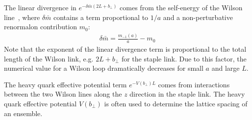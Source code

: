 \documentclass[prd,aps,twocolumn,preprintnumbers, showpacs, nofootinbib,superscriptaddress,notitlepage]{revtex4-1}
\newcommand\bl{\color{blue}}
\begin{document}
The linear divergence {\bl in} $e^{-\delta \bar{m}(2L+b_{\perp})}$ comes from the self-energy of  {\bl the}  Wilson line~\cite{Ji:2017oey,Ishikawa:2017faj,Green:2017xeu, Ji:2020brr}, where $\delta\bar m$ {\bl contains a term  proportional to} $1/a$  and {\bl a  non-perturbative renormalon contribution} $m_{0}$:
\begin{align}
\delta\bar m = \frac{m_{-1}(a)}{a} - m_0
\end{align}
{\bl Note} that the exponent {\bl of the linear divergence term} is proportional to the total length of {\bl the} Wilson link, e.g. $2L+b_{\perp}$ for the staple link. Due to this factor,  the numerical value for {\bl a} Wilson loop dramatically {\bl decreases}  for small $a$ and large $L$. 

The heavy quark effective potential term $e^{-V(b_{\perp})L}$ comes from {\bl interactions} between the two Wilson lines along the $z$ direction in the staple link. The heavy quark effective potential $V(b_{\perp})$ is often used to determine the lattice spacing of an ensemble.  

\begin{comment}
One can study the Wilson line with heavy quark effective theory and calculate the logarithmic  divergence $Z_{O}$  from the {\bl light-heavy} quark vertex perturbatively at leading order~\cite{Ji:2020ect,Constantinou:2017sej}:
\begin{align}
Z_{O} = 1+\frac{3 C_{F} \alpha_{s}}{2 \pi} \frac{1}{4-D}, 
\end{align}
with $D$ being the space-time dimension. 
The logarithmic  divergence up to next-to-leading order, resumed by renormalization group equation, and matched to lattice is~\cite{Ji:1991pr, LatticePartonCollaborationLPC:2021xdx} 
\begin{align}\label{eq:ZO_RS_higher}
Z_{O}(1/a, \mu)=\left(\frac{\ln [1 /(a \Lambda_{\rm QCD})]}{\ln [\mu / \Lambda_{\rm QCD}]}\right)^{\frac{3 C_{F}}{b_0}}\left(1+\frac{d}{\ln[a \Lambda_{\rm QCD}]}\right),\nonumber\\
\end{align}
where $\Lambda_{\rm QCD}$   is different from that of {\bl the} $\overline{\rm MS}$ scheme and lattice perturbation theory. One can use it to effectively absorb higher order contributions~\cite{Lepage:1992xa}. $d$ is the next to leading order anomalous dimension which contains scheme conversion constants. Both $\Lambda_{\rm QCD}$ and $d$ depend on the specific lattice action.  
\end{comment}
\end{document}
